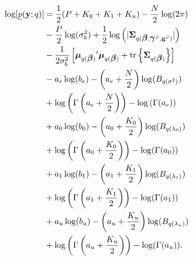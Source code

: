 \documentclass[10pt]{article}
\newcommand{\bbeta}{{\mbox{\boldmath$\beta$}}}
\newcommand{\bgamma}{{\mbox{\boldmath$\gamma$}}}
\newcommand{\bmu}{{\mbox{\boldmath$\mu$}}}
\newcommand{\bSigma}{{\mbox{\boldmath$\Sigma$}}}
\newcommand{\by}{\textbf{y}}
\newcommand{\bg}{\textbf{g}}
\newcommand{\up}{\underline{p}}
\begin{document}
	\begin{align*}
		\log[ \up(\by; q) ] &= \frac{1}{2}(P + K_0 + K_1 + K_u) - \frac{N}{2}\log(2\pi) \\
			&- \frac{P}{2}\log(\sigma_b^2) + \frac{1}{2}\log\left(|\bSigma_{q(\bbeta, \bgamma^S, \bg^S)}|\right) \\
			&- \frac{1}{2\sigma_b^2}\left[ {\bmu_{q(\bbeta)}}'\bmu_{q(\bbeta)} + \text{tr}\left\{\bSigma_{q(\bbeta)}\right\} \right] \\
			&- a_e\log(b_e) - \left(a_e + \frac{N}{2}\right)\log(B_{q(\sigma^2)}) \\
			&+ \log\left(\Gamma\left(a_e + \frac{N}{2}\right)\right) - \log\left(\Gamma(a_e)\right) \\
			&+ a_0\log(b_0) - \left(a_0 + \frac{K_0}{2}\right)\log(B_{q(\lambda_0)}) \\
			&+ \log\left(\Gamma\left(a_0 + \frac{K_0}{2}\right)\right) - \log(\Gamma(a_0))	\\
			&+ a_1\log(b_1) - \left(a_1 + \frac{K_1}{2}\right)\log(B_{q(\lambda_1)}) \\
			&+ \log\left(\Gamma\left(a_1 + \frac{K_1}{2}\right)\right) - \log(\Gamma(a_1))	\\
			&+ a_u\log(b_u) - \left(a_u + \frac{K_u}{2}\right)\log(B_{q(\lambda_u)}) \\
			&+ \log\left(\Gamma\left(a_u + \frac{K_u}{2}\right)\right) - \log(\Gamma(a_u)).
	\end{align*}
\end{document}
